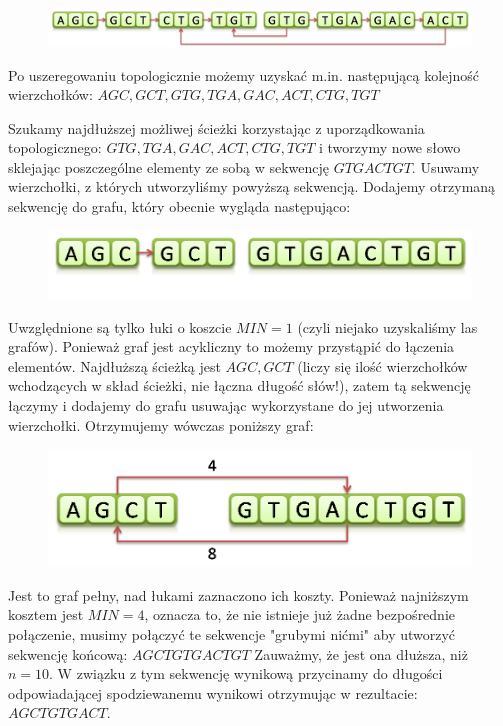 \documentclass[a4paper,10pt]{article}
\begin{document}
\begin{figure}[h]
  \footnotesize\centering
  \includegraphics[width=\textwidth,keepaspectratio]{Graph2.png}
\end{figure}

Po uszeregowaniu topologicznie możemy uzyskać m.in. następującą kolejność wierzchołków:
$AGC, GCT, GTG, TGA, GAC, ACT, CTG, TGT$

Szukamy najdłuższej możliwej ścieżki korzystając z uporządkowania topologicznego: $GTG, TGA, GAC, ACT, CTG, TGT$
i tworzymy nowe słowo sklejając poszczególne elementy ze sobą w sekwencję $GTGACTGT$.
Usuwamy wierzchołki, z których utworzyliśmy powyższą sekwencją. Dodajemy otrzymaną sekwencję do grafu, który obecnie wygląda następująco:

\begin{figure}[h]
  \footnotesize\centering
  \includegraphics[width=\textwidth,keepaspectratio]{Graph3.png}
\end{figure}

Uwzględnione są tylko łuki o koszcie $MIN=1$ (czyli niejako uzyskaliśmy las grafów). 
Ponieważ graf jest acykliczny to możemy przystąpić do łączenia elementów. 
Najdłuższą ścieżką jest $AGC, GCT$ (liczy się ilość wierzchołków wchodzących w skład ścieżki, nie łączna długość słów!), 
zatem tą sekwencję łączymy i dodajemy do grafu usuwając wykorzystane do jej utworzenia wierzchołki.
Otrzymujemy wówczas poniższy graf:

\begin{figure}[h]
  \footnotesize\centering
  \includegraphics[width=\textwidth,keepaspectratio]{Graph4.png}
\end{figure}
		 
Jest to graf pełny, nad łukami zaznaczono ich koszty. Ponieważ najniższym kosztem jest $MIN=4$, oznacza to, że nie istnieje już 
żadne bezpośrednie połączenie, musimy połączyć te sekwencje "grubymi nićmi" aby utworzyć sekwencję końcową:
$AGCTGTGACTGT$
Zauważmy, że jest ona dłuższa, niż $n=10$. W związku z tym sekwencję wynikową przycinamy do długości odpowiadającej spodziewanemu wynikowi otrzymując w rezultacie:
$AGCTGTGACT$.
\end{document}
